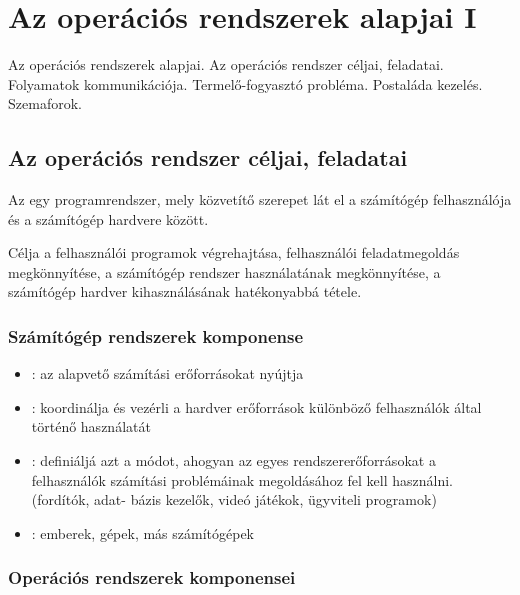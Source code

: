 \documentclass[../main.tex]{subfiles}
\begin{document}
\section{Az operációs rendszerek alapjai I}

\begin{fulltheorem}
	Az operációs rendszerek alapjai. Az operációs rendszer céljai, feladatai.
	Folyamatok kommunikációja. Termelő-fogyasztó probléma. Postaláda kezelés.
	Szemaforok.
\end{fulltheorem}

\subsection{Az operációs rendszer céljai, feladatai}

Az  egy programrendszer, mely közvetítő szerepet
lát el a számítógép felhasználója és a számítógép hardvere között.

Célja a felhasználói programok végrehajtása, felhasználói feladatmegoldás
megkönnyítése, a számítógép rendszer használatának megkönnyítése, a
számítógép hardver kihasználásának hatékonyabbá tétele.

\subsubsection*{Számítógép rendszerek komponense}

\begin{itemize}
	\item {}:
	      az alapvető számítási erőforrásokat nyújtja
	\item {}:
	      koordinálja és vezérli a hardver erőforrások különböző
	      felhasználók által történő használatát
	\item {}:
	      definiáljá azt a módot, ahogyan az egyes rendszererőforrásokat
	      a felhasználók számítási problémáinak megoldásához fel kell használni.
	      (fordítók, adat- bázis kezelők, videó játékok, ügyviteli programok)
	\item {}:
	      emberek, gépek, más számítógépek
\end{itemize}

\subsubsection*{Operációs rendszerek komponensei}
\end{document}
